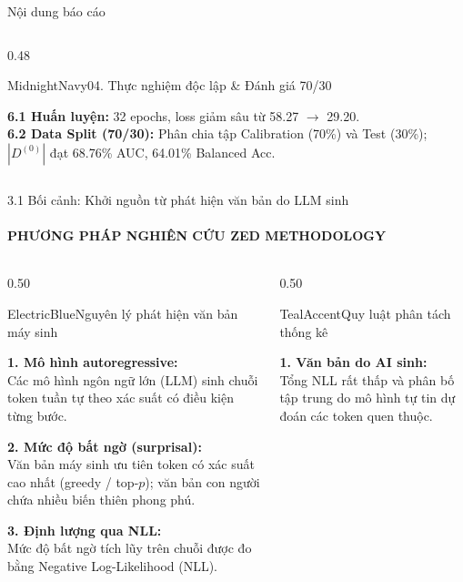 \documentclass[aspectratio=169, 10pt, t]{beamer}
\begin{document}
\begin{frame}{Nội dung báo cáo}
\begin{columns}[t]
\begin{column}{0.48\textwidth}
      \begin{accentbox}[equal height group=toc2, top=0.7mm, bottom=0.7mm]{MidnightNavy}{04. Thực nghiệm độc lập \& Đánh giá 70/30}
        \raggedright\scriptsize
        \textbf{6.1 Huấn luyện:} 32 epochs, loss giảm sâu từ 58.27 $\to$ 29.20.\\
        \vspace{0.04em}
        \textbf{6.2 Data Split (70/30):} Phân chia tập Calibration (70\%) và Test (30\%); $|D^{(0)}|$ đạt 68.76\% AUC, 64.01\% Balanced Acc.
      \end{accentbox}
    \end{column}
  \end{columns}
\end{frame}

\begin{frame}{3.1 Bối cảnh: Khởi nguồn từ phát hiện văn bản do LLM sinh}
  \framesubtitle{PHƯƠNG PHÁP NGHIÊN CỨU \;\textbar\; ZED METHODOLOGY}
  \begin{columns}[t]
    \begin{column}{0.50\textwidth}
      \begin{accentbox}[equal height group=ctx]{ElectricBlue}{Nguyên lý phát hiện văn bản máy sinh}
        \raggedright\scriptsize
        \textbf{1. Mô hình autoregressive:}\\
        Các mô hình ngôn ngữ lớn (LLM) sinh chuỗi token tuần tự theo xác suất có điều kiện từng bước.
        \vspace{0.30em}

        \textbf{2. Mức độ bất ngờ (surprisal):}\\
        Văn bản máy sinh ưu tiên token có xác suất cao nhất (greedy / top-$p$); văn bản con người chứa nhiều biến thiên phong phú.
        \vspace{0.30em}

        \textbf{3. Định lượng qua NLL:}\\
        Mức độ bất ngờ tích lũy trên chuỗi được đo bằng Negative Log-Likelihood (NLL).
      \end{accentbox}
    \end{column}
    \begin{column}{0.50\textwidth}
      \begin{accentbox}[equal height group=ctx]{TealAccent}{Quy luật phân tách thống kê}
        \raggedright\scriptsize
        \textbf{1. Văn bản do AI sinh:}\\
        Tổng NLL rất thấp và phân bố tập trung do mô hình tự tin dự đoán các token quen thuộc.
        \vspace{0.35em}


\end{accentbox}
\end{column}
\end{columns}
\end{frame}
\end{document}

